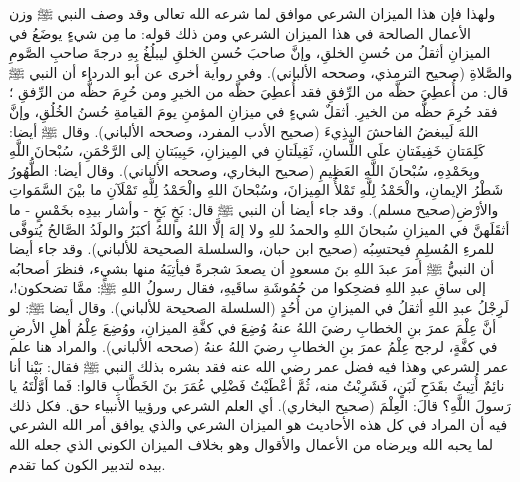 ولهذا فإن هذا الميزان الشرعي موافق لما شرعه الله تعالى وقد وصف النبي ﷺ وزن الأعمال الصالحة في هذا الميزان الشرعي ومن ذلك قوله: 
ما مِن شيءٍ يوضَعُ في الميزانِ أثقلُ من حُسنِ الخلقِ، وإنَّ صاحبَ حُسنِ الخلقِ ليبلُغُ بِهِ درجةَ صاحبِ الصَّومِ والصَّلاةِ {\footnotesize (صحيح الترمذي، وصححه الألباني)}. وفي رواية أخرى عن أبو الدرداء أن النبي  ﷺ قال:
من أُعطِيَ حظَّه من الرِّفقِ فقد أُعطِيَ حظَّه من الخيرِ ومن حُرِمَ حظُّه من الرِّفقِ ؛ فقد حُرِمَ حظُّه من الخيرِ. أثقلٌ شيءٍ في ميزانِ المؤمنِ يومَ القيامةِ حُسنُ الخُلُقِ، وإنَّ اللهَ لَيبغضُ الفاحشَ البذِيءَ {\footnotesize (صحيح الأدب المفرد، وصححه الألباني)}. وقال ﷺ أيضا: 
كَلِمَتانِ خَفِيفَتانِ علَى اللِّسانِ، ثَقِيلَتانِ في المِيزانِ، حَبِيبَتانِ إلى الرَّحْمَنِ، سُبْحانَ اللَّهِ وبِحَمْدِهِ، سُبْحانَ اللَّهِ العَظِيمِ {\footnotesize (صحيح البخاري، وصححه الألباني)}. وقال أيضا:
الطُّهُورُ شَطْرُ الإيمانِ، والْحَمْدُ لِلَّهِ تَمْلأُ المِيزانَ، وسُبْحانَ اللهِ والْحَمْدُ لِلَّهِ تَمْلَآنِ ما بيْنَ السَّمَواتِ والأرْضِ{\footnotesize (صحيح مسلم)}.  وقد جاء أيضا أن النبي ﷺ قال: بَخٍ بَخٍ - وأشار بيدِه بخَمْسٍ - ما أثقَلَهنَّ في الميزانِ سُبحانَ اللهِ والحمدُ للهِ ولا إلهَ إلَّا اللهُ واللهُ أكبَرُ والولَدُ الصَّالحُ يُتوفَّى للمرءِ المُسلِمِ فيحتسِبُه {\footnotesize (صحيح ابن حبان، والسلسلة الصحيحة للألباني)}. وقد جاء أيضا أن النبيُّ ﷺ أمرَ عبدَ اللهِ بنَ مسعودٍ أن يصعدَ شجرةً فيأتِيَهُ منها بشيٍء، فنظرَ أصحابُه إلى ساقِ عبدِ اللهِ فضحِكوا من حُمُوشَةِ ساقَيهِ، فقال رسولُ اللهِ ﷺ: ممَّا تضحكون!، لَرِجْلُ عبدِ اللهِ أثقلُ في الميزانِ من أُحُدٍ {\footnotesize (السلسلة الصحيحة للألباني)}. وقال أيضا ﷺ: لو أنَّ عِلْمَ عمرَ بنِ الخطابِ رضيَ اللهُ عنهُ وُضِعَ في كفَّةِ الميزانِ، ووُضِعَ عِلْمُ أهلِ الأرضِ في كفَّةٍ، لرجح عِلْمُ عمرَ بنِ الخطابِ رضيَ اللهُ عنهُ {\footnotesize (صححه الألباني)}. والمراد هنا علم عمر الشرعي وهذا فيه فضل عمر رضي الله عنه فقد بشره بذلك النبي ﷺ فقال: بَيْنا أنا نائِمٌ أُتِيتُ بقَدَحِ لَبَنٍ، فَشَرِبْتُ منه، ثُمَّ أعْطَيْتُ فَضْلِي عُمَرَ بنَ الخَطَّابِ قالوا: فَما أوَّلْتَهُ يا رَسولَ اللَّهِ؟ قالَ: العِلْمَ {\footnotesize (صحيح البخاري)}. أي العلم الشرعي ورؤييا الأنبياء حق. فكل ذلك فيه أن المراد في كل هذه الأحاديث هو الميزان الشرعي والذي يوافق أمر الله الشرعي لما يحبه الله ويرضاه من الأعمال والأقوال وهو بخلاف الميزان الكوني الذي جعله الله بيده لتدبير الكون كما تقدم.

